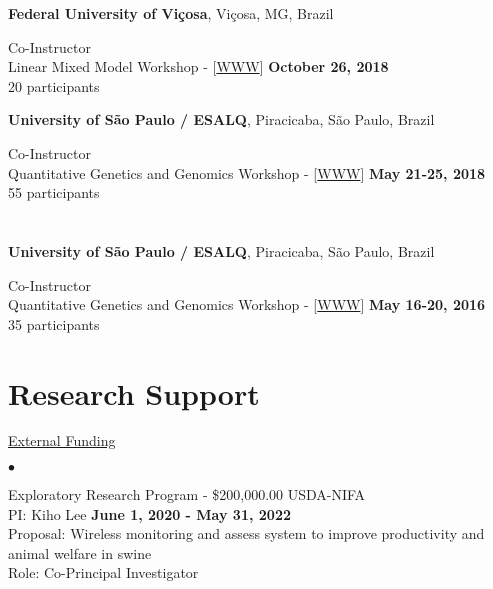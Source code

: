 \documentclass[margin,line,10pt]{res}
\newenvironment{list2}{
  \begin{list}{$\bullet$}{%
      \setlength{\itemsep}{0in}
      \setlength{\parsep}{0in} \setlength{\parskip}{0in}
      \setlength{\topsep}{0in} \setlength{\partopsep}{0in} 
      \setlength{\leftmargin}{0.2in}}}{\end{list}}
\begin{document}
\begin{resume}
{\bf Federal University of Vi\c cosa}, Vi\c cosa, MG, Brazil
\vspace{.01pt}

Co-Instructor  \\
Linear Mixed Model Workshop - [\textcolor{blue}{\href{http://morotalab.org/UFV2018/UFV2018.html}{WWW}}]
\hfill {\bf October 26, 2018} \\
20 participants


{\bf University of S\~{a}o Paulo / ESALQ}, Piracicaba, S\~{a}o Paulo, Brazil
\vspace{.01pt}

Co-Instructor  \\
Quantitative Genetics and Genomics Workshop - [\textcolor{blue}{\href{http://morotalab.org/ESALQ2018/ESALQ2018.html}{WWW}}]
\hfill {\bf May 21-25, 2018} \\
55 participants


\section{}


{\bf University of S\~{a}o Paulo / ESALQ}, Piracicaba, S\~{a}o Paulo, Brazil
\vspace{.01pt}


Co-Instructor  \\
Quantitative Genetics and Genomics Workshop - [\textcolor{blue}{\href{http://morotalab.org/ESALQ2016/ESALQ2016.html}{WWW}}]
\hfill {\bf May 16-20, 2016} \\
35 participants  






\vspace{0.5cm}
\section{\sc Research Support}
\begin{flushleft}
\hspace{0.2cm} \underline{External Funding}
\end{flushleft}

\begin{list2}


\item Exploratory Research Program - \$200,000.00  \hfill USDA-NIFA\\
  PI: Kiho Lee   \hfill \textbf{June 1, 2020 -  May 31, 2022}\\
Proposal: Wireless monitoring and assess system to improve productivity and animal welfare in swine  \\
Role: Co-Principal Investigator \\



\end{list2}
\end{resume}
\end{document}
